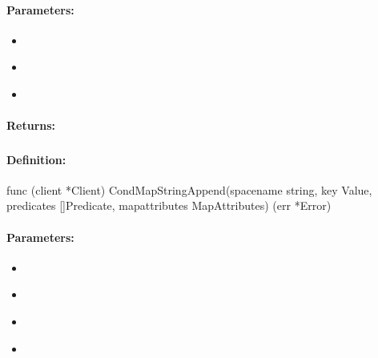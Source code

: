 \paragraph{Parameters:}
\begin{itemize}[noitemsep]
\item {}\\

\item {}\\

\item {}\\

\end{itemize}

\paragraph{Returns:}


\pagebreak
\subsubsection{}
\label{api:Go:CondMapStringAppend}


\paragraph{Definition:}
\begin{gocode}
func (client *Client) CondMapStringAppend(spacename string, key Value, predicates []Predicate, mapattributes MapAttributes) (err *Error)
\end{gocode}

\paragraph{Parameters:}
\begin{itemize}[noitemsep]
\item {}\\

\item {}\\

\item {}\\

\item {}\\

\end{itemize}


